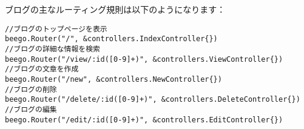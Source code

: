 ブログの主なルーティング規則は以下のようになります：

\begin{lstlisting}[numbers=none]
//ブログのトップページを表示
beego.Router("/", &controllers.IndexController{})
//ブログの詳細な情報を検索
beego.Router("/view/:id([0-9]+)", &controllers.ViewController{})
//ブログの文章を作成
beego.Router("/new", &controllers.NewController{})
//ブログの削除
beego.Router("/delete/:id([0-9]+)", &controllers.DeleteController{})
//ブログの編集
beego.Router("/edit/:id([0-9]+)", &controllers.EditController{})
\end{lstlisting}

